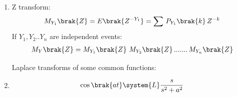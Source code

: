 \begin{enumerate}[label=\thesubsection.\arabic*,ref=\thesubsection.\theenumi]
\item
Z transform:\label{eq:ztransform}\\
\begin{align}
	M_{Y_1}\brak{Z}=E\brak{Z^{-Y_1}}=\sum\, P_{Y_1}\brak{k}\,Z^{-k}\label{eq:ztransformdef}
\end{align}
If $Y_1,Y_2..Y_n$ are independent events:
\begin{align}
M_Y\brak{Z}=M_{Y_1}\brak{Z}\,\, M_{Y_2}\brak{Z}\,.......\,M_{Y_n}\brak{Z}\label{eq:ztransformindep}
\end{align}


Laplace transforms of some common functions:\label{eq:laplacecommon}

\item
\begin{align}
\cos\brak{at}\system{L}\frac{s}{s^2+a^2}\label{eq:laplacecos}
\end{align}


\end{enumerate}
